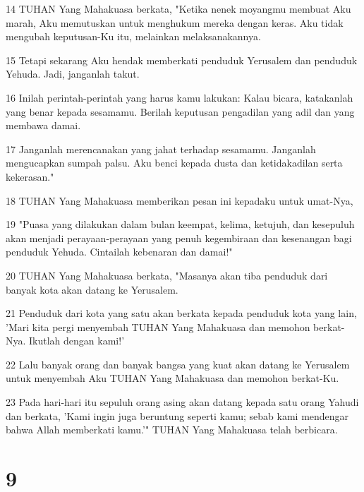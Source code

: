 \par 14 TUHAN Yang Mahakuasa berkata, "Ketika nenek moyangmu membuat Aku marah, Aku memutuskan untuk menghukum mereka dengan keras. Aku tidak mengubah keputusan-Ku itu, melainkan melaksanakannya.
\par 15 Tetapi sekarang Aku hendak memberkati penduduk Yerusalem dan penduduk Yehuda. Jadi, janganlah takut.
\par 16 Inilah perintah-perintah yang harus kamu lakukan: Kalau bicara, katakanlah yang benar kepada sesamamu. Berilah keputusan pengadilan yang adil dan yang membawa damai.
\par 17 Janganlah merencanakan yang jahat terhadap sesamamu. Janganlah mengucapkan sumpah palsu. Aku benci kepada dusta dan ketidakadilan serta kekerasan."
\par 18 TUHAN Yang Mahakuasa memberikan pesan ini kepadaku untuk umat-Nya,
\par 19 "Puasa yang dilakukan dalam bulan keempat, kelima, ketujuh, dan kesepuluh akan menjadi perayaan-perayaan yang penuh kegembiraan dan kesenangan bagi penduduk Yehuda. Cintailah kebenaran dan damai!"
\par 20 TUHAN Yang Mahakuasa berkata, "Masanya akan tiba penduduk dari banyak kota akan datang ke Yerusalem.
\par 21 Penduduk dari kota yang satu akan berkata kepada penduduk kota yang lain, 'Mari kita pergi menyembah TUHAN Yang Mahakuasa dan memohon berkat-Nya. Ikutlah dengan kami!'
\par 22 Lalu banyak orang dan banyak bangsa yang kuat akan datang ke Yerusalem untuk menyembah Aku TUHAN Yang Mahakuasa dan memohon berkat-Ku.
\par 23 Pada hari-hari itu sepuluh orang asing akan datang kepada satu orang Yahudi dan berkata, 'Kami ingin juga beruntung seperti kamu; sebab kami mendengar bahwa Allah memberkati kamu.'" TUHAN Yang Mahakuasa telah berbicara.

\chapter{9}


